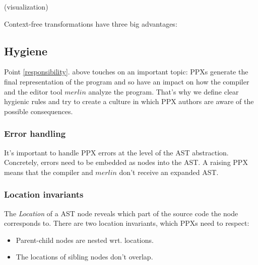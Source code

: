 \documentclass[10pt, a4paper, twocolumn]{article}
\begin{document}
(visualization)

\vspace{25pt}

Context-free transformations have three big advantages:

\subsection{Hygiene}

Point \ref{responsibility}. above touches on an important topic: PPXs generate the final representation of the program and so have an impact on how the compiler and the editor tool $merlin$ analyze the program. That's why we define clear hygienic rules\cite{hygiene} and try to create a culture in which PPX authors are aware of the possible consequences.

\subsubsection*{Error handling}

It's important to handle PPX errors at the level of the AST abstraction. Concretely, errors need to be embedded as nodes into the AST. A raising PPX means that the compiler and $merlin$ don't receive an expanded AST.

\subsubsection*{Location invariants}

The \emph{Location} of a AST node reveals which part of the source code the node corresponds to.
There are two location invariants, which PPXs need to respect:
\begin{itemize}
\item Parent-child nodes are nested wrt. locations.
\item The locations of sibling nodes don't overlap.
\end{itemize}
\end{document}

